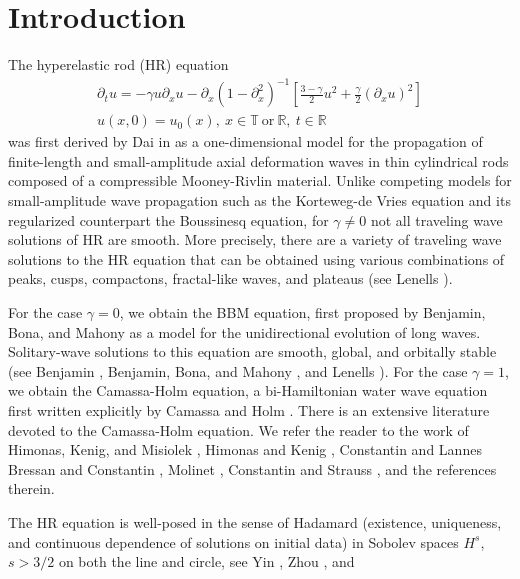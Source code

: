 \documentclass[12pt,reqno]{amsart}
\numberwithin{equation}{section}  %
\numberwithin{figure}{section}
\newcommand{\rr}{\mathbb{R}}
\newcommand{\ci}{\mathbb{T}}
\newcommand{\p}{\partial}
\begin{document}
\section{Introduction}
%
%
%
The hyperelastic rod (HR) equation
\begin{gather}
\label{hyperelastic-rod-equation}
\p_t u =  -\gamma u \p_x u -
\p_{x} (1 - \p_{x}^{2})^{-1} \left[ \frac{3-\gamma}{2}u^2 +
\frac{\gamma}{2} \left( \p_x u \right)^2
\right]
\\
u(x,0) = u_0(x), \ x \in \ci \ \text{or} \ \rr, \ t \in \rr
\label{init-cond}
\end{gather}
was first
derived by Dai in \cite{Dai:1998gh} as a one-dimensional 
model for the propagation of finite-length and
small-amplitude axial deformation waves in thin cylindrical
rods composed of a compressible Mooney-Rivlin
material. Unlike competing models for small-amplitude wave propagation such as
the Korteweg-de Vries equation and its regularized counterpart the Boussinesq equation, for $\gamma \neq 0$ not all traveling wave solutions of HR are smooth. More precisely, there are a variety of traveling wave solutions to the HR equation that
can be obtained using various combinations of peaks, cusps, compactons,
fractal-like waves, and plateaus (see Lenells 
\cite{Lenells:2006mo}). 
\par
For the case $\gamma = 0$, we obtain the 
BBM equation, first proposed by 
Benjamin, Bona, and Mahony 
\cite{Benjamin:1972ny} as a model for 
the unidirectional evolution of long waves.
Solitary-wave solutions to this 
equation are smooth, global, and orbitally stable (see Benjamin 
\cite{Benjamin:1972xm}, Benjamin, Bona, and Mahony
\cite{Benjamin:1972ny}, and Lenells
\cite{Lenells:2006mo}). For the case $\gamma =1$, we obtain the Camassa-Holm equation, a bi-Hamiltonian
water wave equation first written explicitly by Camassa and Holm
\cite{Camassa:1993nu}. There is an extensive
literature devoted to the Camassa-Holm equation. We refer the reader to the work
of Himonas, Kenig, and Misiolek \cite{Himonas:2010vp}, Himonas and Kenig
\cite{Himonas:2009ck}, Constantin and Lannes
\cite{Constantin:2009wx}
Bressan and Constantin \cite{Bressan:2007bq}, 
Molinet \cite{Molinet:2004km}, Constantin and Strauss
\cite{Constantin:2000rf}, and the references therein.
\par
The HR equation is well-posed in the sense of Hadamard (existence, uniqueness,
and continuous dependence of solutions on initial data) in Sobolev spaces
$H^{s}$, $s > 3/2$ on both the line and circle, see Yin
\cite{Yin:2003ii}, Zhou \cite{Zhou:2005si}, and
\end{document}
